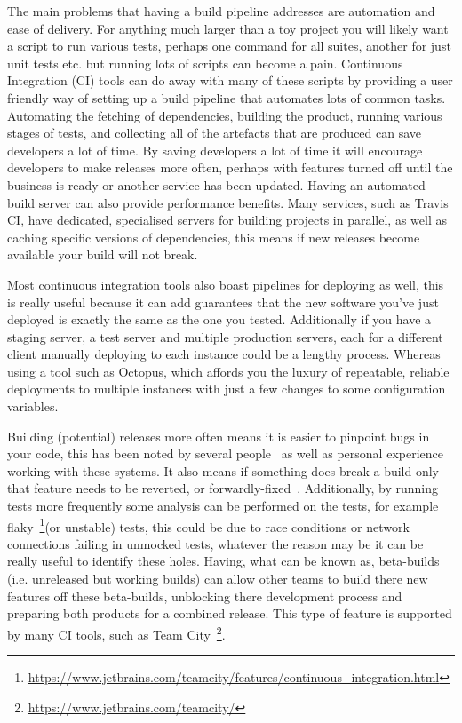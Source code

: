 The main problems that having a build pipeline addresses are automation and ease of delivery.
For anything much larger than a toy project you will likely want a script to run various tests,
perhaps one command for all suites, another for just unit tests etc. but running lots of scripts can become a pain.
Continuous Integration (CI) tools can do away with many of these scripts by providing a user friendly way of setting up a build pipeline that automates lots of common tasks.
Automating the fetching of dependencies, building the product, running various stages of tests, and collecting all of the artefacts that are produced can save developers a lot of time.
By saving developers a lot of time it will encourage developers to make releases more often,
perhaps with features turned off until the business is ready or another service has been updated.
Having an automated build server can also provide performance benefits.
Many services, such as Travis CI, have dedicated, specialised servers for building projects in parallel,
as well as caching specific versions of dependencies,
this means if new releases become available your build will not break.
\par
Most continuous integration tools also boast pipelines for deploying as well,
this is really useful because it can add guarantees that the new software you've just deployed is exactly the same as the one you tested.
Additionally if you have a staging server, a test server and multiple production servers,
each for a different client manually deploying to each instance could be a lengthy process.
Whereas using a tool such as Octopus, which affords you the luxury of repeatable,
reliable deployments to multiple instances with just a few changes to some configuration variables.
\par
Building (potential) releases more often means it is easier to pinpoint bugs in your code,
this has been noted by several people~\cite{A,B,C} as well as personal experience working with these systems.
It also means if something does break a build only that feature needs to be reverted, or forwardly-fixed~\cite{D}.
Additionally, by running tests more frequently some analysis can be performed on the tests, for example flaky~\footnote{\url{https://www.jetbrains.com/teamcity/features/continuous_integration.html}}(or unstable) tests,
this could be due to race conditions or network connections failing in unmocked tests,
whatever the reason may be it can be really useful to identify these holes.
Having, what can be known as, beta-builds (i.e. unreleased but working builds) can allow other teams to build there new features off these beta-builds,
unblocking there development process and preparing both products for a combined release.
This type of feature is supported by many CI tools, such as Team City~\footnote{\url{https://www.jetbrains.com/teamcity/}}.


